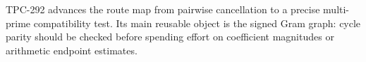 \documentclass[10pt]{article}
\begin{document}
TPC-292 advances the route map from pairwise cancellation to a precise
multi-prime compatibility test.  Its main reusable object is the signed
Gram graph: cycle parity should be checked before spending effort on
coefficient magnitudes or arithmetic endpoint estimates.



\end{document}
